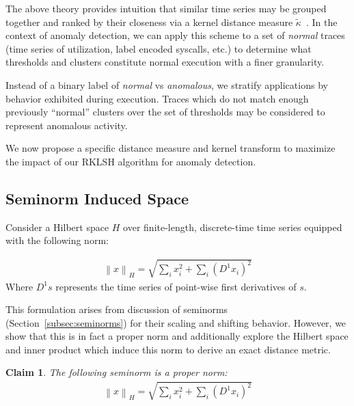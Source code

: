 \documentclass[a4paper]{article}
\newcommand{\norm}[1]{\left\lVert#1\right\rVert}
\theoremstyle{def}
\theoremstyle{thm}
\newtheorem{claim}[proposition]{Claim}
\begin{document}
The above theory provides intuition that similar time series may be grouped together and ranked by their closeness via a kernel distance measure $\tilde{\kappa}$~\cite{Hachiya13-NSH}.
In the context of anomaly detection, we can apply this scheme to a set of \textit{normal} traces (time series of utilization, label encoded syscalls, etc.) to determine what thresholds and clusters constitute normal execution with a finer granularity.

Instead of a binary label of \textit{normal} vs \textit{anomalous}, we stratify applications by behavior exhibited during execution.
Traces which do not match enough previously ``normal'' clusters over the set of thresholds may be considered to represent anomalous activity.

We now propose a specific distance measure and kernel transform to maximize the impact of our RKLSH algorithm for anomaly detection.

\subsection{Seminorm Induced Space}

Consider a Hilbert space $H$ over finite-length, discrete-time time series equipped with the following norm:

\begin{align}\label{eqn:norm}
    \norm{x}_H = \sqrt{\sum\limits_i{x_i^2} + \sum\limits_i{(D^1 x_i)}^2}
\end{align}
Where $D^1 s$ represents the time series of point-wise first derivatives of $s$.

This formulation arises from discussion of seminorms (Section~\ref{subsec:seminorms}) for their scaling and shifting behavior.
However, we show that this is in fact a proper norm and additionally explore the Hilbert space and inner product which induce this norm to derive an exact distance metric.

\begin{claim}
    The following seminorm is a proper norm:
    \begin{align*}
        \norm{x}_H = \sqrt{\sum\limits_i{x_i^2} + \sum\limits_i{(D^1 x_i)}^2}
    \end{align*}
\end{claim}
\end{document}
